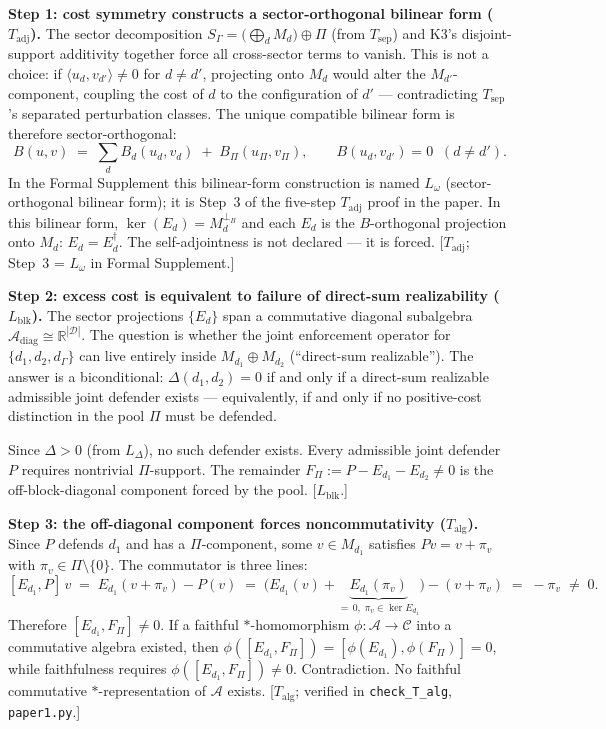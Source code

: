\documentclass[11pt]{article}
\theoremstyle{remark}
\begin{document}
\noindent\textbf{Step 1: cost symmetry constructs a sector-orthogonal bilinear form ($T_{\mathrm{adj}}$).}
The sector decomposition $S_\Gamma = \bigl(\bigoplus_d M_d\bigr) \oplus \Pi$
(from $T_{\mathrm{sep}}$) and K3's disjoint-support additivity together force
all cross-sector terms to vanish.  This is not a choice: if
$\langle u_d, v_{d'}\rangle \ne 0$ for $d \ne d'$, projecting onto $M_d$
would alter the $M_{d'}$-component, coupling the cost of $d$ to the
configuration of $d'$ --- contradicting $T_{\mathrm{sep}}$'s separated
perturbation classes.  The unique compatible bilinear form is therefore
sector-orthogonal:
\[
B(u, v) \;=\; \sum_d B_d(u_d, v_d)
\;+\; B_\Pi(u_\Pi, v_\Pi),
\qquad B(u_d, v_{d'}) = 0 \;\; (d \ne d').
\]
In the Formal Supplement this bilinear-form construction is named
$L_\omega$ (sector-orthogonal bilinear form); it is Step~3 of the
five-step $T_{\mathrm{adj}}$ proof in the paper.  In this bilinear form,
$\ker(E_d) = M_d^{\perp_B}$ and each $E_d$ is the $B$-orthogonal projection
onto $M_d$: $E_d = E_d^\dagger$.  The self-adjointness is not declared ---
it is forced.  [$T_{\mathrm{adj}}$; Step~3 = $L_\omega$ in Formal Supplement.]

\medskip

\noindent\textbf{Step 2: excess cost is equivalent to failure of direct-sum
realizability ($L_{\mathrm{blk}}$).}  The sector projections $\{E_d\}$ span
a commutative diagonal subalgebra $\mathcal{A}_{\mathrm{diag}} \cong
\mathbb{R}^{|\mathcal{D}|}$.  The question is whether the joint enforcement
operator for $\{d_1, d_2, d_\Gamma\}$ can live entirely inside
$M_{d_1} \oplus M_{d_2}$ (``direct-sum realizable'').  The answer is a
biconditional: $\Delta(d_1,d_2) = 0$ if and only if a direct-sum realizable
admissible joint defender exists --- equivalently, if and only if no
positive-cost distinction in the pool $\Pi$ must be defended.

Since $\Delta > 0$ (from $L_\Delta$), no such defender exists.  Every
admissible joint defender $P$ requires nontrivial $\Pi$-support.  The
remainder $F_\Pi := P - E_{d_1} - E_{d_2} \ne 0$ is the off-block-diagonal
component forced by the pool.  [$L_{\mathrm{blk}}$.]

\medskip

\noindent\textbf{Step 3: the off-diagonal component forces noncommutativity
($T_{\mathrm{alg}}$).}  Since $P$ defends $d_1$ and has a $\Pi$-component,
some $v \in M_{d_1}$ satisfies $Pv = v + \pi_v$ with $\pi_v \in \Pi \setminus
\{0\}$.  The commutator is three lines:
\[
[E_{d_1}, P]\,v
\;=\; E_{d_1}(v + \pi_v) - P(v)
\;=\; \bigl(E_{d_1}(v) + \underbrace{E_{d_1}(\pi_v)}_{=\,0,\;\pi_v\in\ker E_{d_1}}\bigr) - (v + \pi_v)
\;=\; -\pi_v \;\ne\; 0.
\]
Therefore $[E_{d_1}, F_\Pi] \ne 0$.  If a faithful $*$-homomorphism
$\phi: \mathcal{A} \to \mathcal{C}$ into a commutative algebra existed,
then $\phi([E_{d_1}, F_\Pi]) = [\phi(E_{d_1}), \phi(F_\Pi)] = 0$, while
faithfulness requires $\phi([E_{d_1}, F_\Pi]) \ne 0$.  Contradiction.
No faithful commutative $*$-representation of $\mathcal{A}$ exists.
[$T_{\mathrm{alg}}$; verified in \texttt{check\_T\_alg}, \texttt{paper1.py}.]
\end{document}
